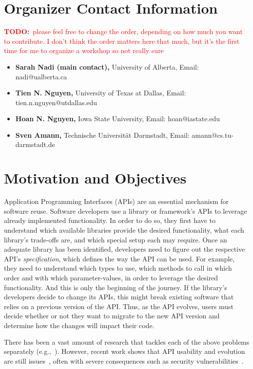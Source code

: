 \documentclass[10pt, conference]{IEEEtran}
\newcommand{\todo}[1]{{\textcolor{red}{\textbf{TODO:}~#1}}}
\begin{document}
\section{Organizer Contact Information}
\todo{please feel free to change the order, depending on how much you want to contribute. I don't think the order matters here that much, but it's the first time for me to organize a workshop so not really sure}
\begin{itemize}
\setlength\itemsep{5pt}
\item \textbf{Sarah Nadi (main contact),} University of Alberta, Email: nadi@ualberta.ca
\item \textbf{Tien N. Nguyen,} University of Texas at Dallas, Email: tien.n.nguyen@utdallas.edu
\item \textbf{Hoan N. Nguyen,} Iowa State University, Email: hoan@iastate.edu
\item \textbf{Sven Amann,} Technische Universit\"{a}t Darmstadt, Email: amann@cs.tu-darmstadt.de
\end{itemize}

\section{Motivation and Objectives}
Application Programming Interfaces (APIs) are an essential mechanism for software reuse. Software developers use a library or framework's APIs to leverage already implemented functionality. In order to do so, they first have to understand which available libraries provide the desired functionality, what each library's trade-offs are, and which special setup each may require. Once an adequate library has been identified, developers need to figure out the respective API's \textit{specification}, which defines the way the API can be used. For example, they need to understand which types to use, which methods to call in which order and with which parameter-values, in order to leverage the desired functionality. And this is only the beginning of the journey. If the library's developers decide to change its APIs, this might break existing software that relies on a previous version of the API. Thus, as the API evolves, users must decide whether or not they want to migrate to the new API version and determine how the changes will impact their code.

There has been a vast amount of research that tackles each of the above problems separately (e.g.,~\cite{Subramanian:2014,RobillardInferenceSurvey,RobillardLearn09, NNP+09, ThungLibRec}). However, recent work shows that API usability and evolution are still issues~\cite{NKMB16, BKHT:FSE16, SunshineAPIProtocol}, often with severe consequences such as security vulnerabilities~\cite{EgeleBFK13}. 
\end{document}
